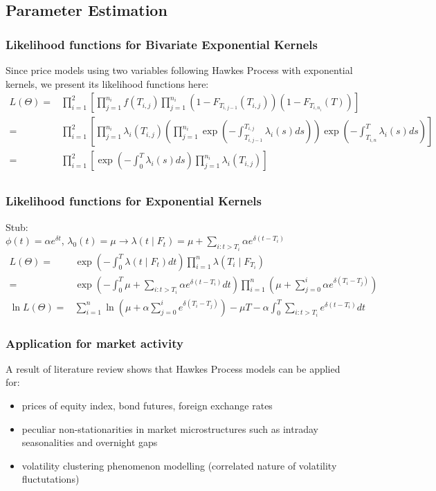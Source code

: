 \documentclass{beamer}
\begin{document}
\subsection{Parameter Estimation}
\begin{frame}
\frametitle{Likelihood functions for Bivariate Exponential Kernels}
Since price models using two variables following Hawkes Process with exponential kernels, we present its likelihood functions here:
\begin{equation*}
\begin{split}
L(\Theta) = &\prod_{i=1}^2 \left[ \prod_{j=1}^{n_i} f(T_{i,j}) \prod_{j=1}^{n_i} (1-F_{T_{i,j-1}}(T_{i,j})) (1-F_{T_{i,n_i}}(T)) \right]\\
= &\prod_{i=1}^2 \left[ \prod_{j=1}^{n_i} \lambda_i(T_{i,j}) \left(\prod_{j=1}^{n_i} \exp(-\int_{T_{i,j-1}}^{T_{i,j}} \lambda_i(s) ds)\right) \exp \left(-\int_{T_{i,n}}^{T} \lambda_i(s) ds\right) \right]\\
= &\prod_{i=1}^2 \left[ \exp \left(-\int_{0}^{T} \lambda_i(s) ds\right) \prod_{j=1}^{n_i} \lambda_i(T_{i,j}) \right]\\
\end{split}
\end{equation*}
\end{frame}

\begin{frame}
\frametitle{Likelihood functions for Exponential Kernels}
Stub:\\
$\phi(t) = \alpha e^{\delta t}$, $\lambda_0(t) = \mu \to \lambda(t \mid F_{t}) = \mu + \sum_{i: t>T_i} \alpha e^{\delta (t - T_{i})}$
\begin{equation*}
\begin{split}
L(\Theta) = &\exp(-\int_{0}^{T} \lambda(t \mid F_t) dt) \prod_{i=1}^n \lambda(T_i \mid F_{T_{i}})\\
= &\exp(-\int_{0}^{T}  \mu + \sum_{i: t>T_i} \alpha e^{\delta (t - T_i)} dt) \prod_{i=1}^n (\mu + \sum_{j=0}^i \alpha e^{\delta (T_i - T_j)})\\[5mm]
\ln L(\Theta) = & \sum_{i=1}^n \ln (\mu + \alpha \sum_{j=0}^i  e^{\delta (T_i - T_j)}) - \mu T - \alpha \int_{0}^{T}  \sum_{i: t>T_i} e^{\delta (t - T_i)} dt 
\end{split}
\end{equation*}
\end{frame}

\begin{frame}
\frametitle{Application for market activity}
A result of literature review shows that Hawkes Process models can be applied for:
\begin{itemize}
	\item prices of equity index, bond futures, foreign exchange rates
	\item peculiar non-stationarities in market microstructures such as intraday seasonalities and overnight gaps
	\item volatility clustering phenomenon modelling (correlated nature of volatility fluctutations)
\end{itemize}
\end{frame}
\end{document}
